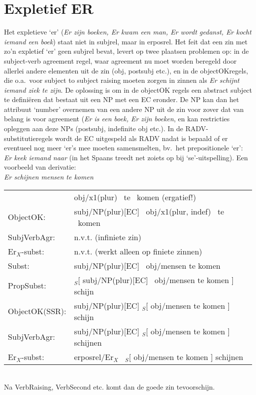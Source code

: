 \section{Expletief ER}
Het expletieve `er' ({\em Er zijn boeken, Er kwam een man, Er wordt gedanst, Er 
kocht iemand een boek\/}) 
staat niet in subjrel, maar in erposrel. Het feit dat een zin met 
zo'n expletief `er' geen subjrel bevat, levert op twee plaatsen problemen op: 
in de subject-verb agreement regel, waar agreement nu moet worden beregeld door 
allerlei andere elementen uit de zin (obj, postsubj etc.), en in de 
objectOKregels, die 
o.a.\ voor subject to subject raising moeten zorgen in zinnen als {\em Er 
schijnt iemand ziek te zijn\/}. De oplossing is om in de objectOK regels een 
abstract subject te defini\"{e}ren dat bestaat uit een NP 
met een EC eronder. De NP kan dan het attribuut `number' overnemen van een 
andere NP uit de zin voor zover dat van belang is voor agreement ({\em Er is 
een boek, Er 
zijn boeken\/}, en kan restricties opleggen aan deze NPs (postsubj, 
indefinite obj etc.). In de RADV-substitutieregels wordt 
de EC uitgespeld als RADV
nadat is bepaald of er eventueel nog meer `er's mee moeten samensmelten, bv.\ 
het prepositionele `er': {\em Er keek iemand naar\/} (in het Spaans treedt net 
zoiets op bij `se'-uitspelling). Een voorbeeld van derivatie:\\[5 mm]
{\em Er schijnen mensen te komen}\\
\begin{tabular}{ll}
            &   obj/x1(plur) \ te \ komen (ergatief!)\\
ObjectOK:   &   subj/NP(plur)[EC] \ obj/x1(plur, indef) \ te \ komen\\
SubjVerbAgr: & n.v.t. (infiniete zin)\\
Er$_{X}$-subst:   & n.v.t. (werkt alleen op finiete zinnen)\\
Subst:       &  subj/NP(plur)[EC] \ obj/mensen  te komen\\[5 mm]

PropSubst:   &  $_{S}$[ subj/NP(plur)[EC] \ obj/mensen te komen ] schijn\\
ObjectOK(SSR):    &  subj/NP(plur)[EC] $_{S}$[ obj/mensen te komen ] schijn\\
SubjVerbAgr:      &  subj/NP(plur)[EC] $_{S}$[ obj/mensen te komen ] schijnen\\
Er$_{X}$-subst:   &  erposrel/Er$_{X}$ \ $_{S}$[ obj/mensen te komen ] 
                                                    schijnen
\end{tabular}
\\[5 mm]
Na VerbRaising, VerbSecond etc. komt dan de goede zin tevoorschijn.



